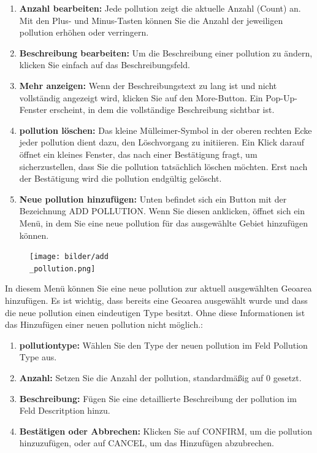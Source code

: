 \documentclass[a4paper,12pt]{article}
\begin{document}
\begin{enumerate}
    \item \textbf{Anzahl bearbeiten:} Jede \gls{pollution} zeigt die aktuelle Anzahl (Count) an. Mit den Plus- und Minus-Tasten können Sie die Anzahl der jeweiligen \gls{pollution} erhöhen oder verringern.
    \item \textbf{Beschreibung bearbeiten:} Um die Beschreibung einer \gls{pollution} zu ändern, klicken Sie einfach auf das Beschreibungsfeld. 
    \item \textbf{Mehr anzeigen:} Wenn der Beschreibungstext zu lang ist und nicht vollständig angezeigt wird, klicken Sie auf den \glqq More\grqq{}-Button. Ein Pop-Up-Fenster erscheint, in dem die vollständige Beschreibung sichtbar ist.
   \item \textbf{\gls{pollution} löschen:} Das kleine Mülleimer-Symbol in der oberen rechten Ecke jeder \gls{pollution} dient dazu, den Löschvorgang zu initiieren. Ein Klick darauf öffnet ein kleines Fenster, das nach einer Bestätigung fragt, um sicherzustellen, dass Sie die \gls{pollution} tatsächlich löschen möchten. Erst nach der Bestätigung wird die \gls{pollution} endgültig gelöscht.
    \item \textbf{Neue \gls{pollution} hinzufügen:} Unten befindet sich ein Button mit der Bezeichnung \glqq ADD POLLUTION\grqq{}. Wenn Sie diesen anklicken, öffnet sich ein Menü, in dem Sie eine neue \gls{pollution} für das ausgewählte Gebiet hinzufügen können.
\end{enumerate}

\begin{figure}[h]
\centering
\texttt{[image: bilder/add\\\_pollution.png]}
\end{figure}

\noindent In diesem Menü können Sie eine neue \gls{pollution} zur aktuell ausgewählten Geoarea hinzufügen. Es ist wichtig, dass bereits eine Geoarea ausgewählt wurde und dass die neue \gls{pollution} einen eindeutigen Type besitzt. Ohne diese Informationen ist das Hinzufügen einer neuen \gls{pollution} nicht möglich.:
\begin{enumerate}
    \item \textbf{\gls{pollutiontype}:} Wählen Sie den Type der neuen \gls{pollution} im Feld \glqq Pollution Type\grqq{} aus.
    \item \textbf{Anzahl:} Setzen Sie die Anzahl der \gls{pollution}, standardmäßig auf 0 gesetzt.
    \item \textbf{Beschreibung:} Fügen Sie eine detaillierte Beschreibung der \gls{pollution} im Feld \glqq Descritption\grqq{} hinzu.
    \item \textbf{Bestätigen oder Abbrechen:} Klicken Sie auf \glqq CONFIRM\grqq{}, um die \gls{pollution} hinzuzufügen, oder auf \glqq CANCEL\grqq{}, um das Hinzufügen abzubrechen.
\end{enumerate}
\end{document}

